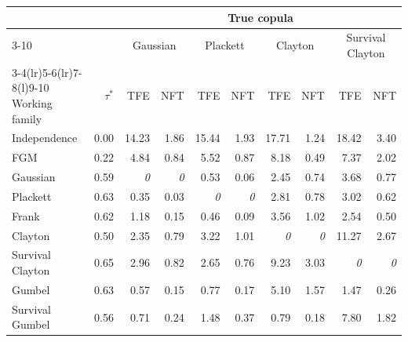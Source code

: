 \small
\begin{tabular}{@{}lrrrrrrrrr@{}}
\toprule
& & \multicolumn{8}{c}{True copula}\\
\cmidrule(l){3-10}
& & \multicolumn{2}{c}{Gaussian} & \multicolumn{2}{c}{Plackett} & \multicolumn{2}{c}{Clayton} & \multicolumn{2}{c}{Survival Clayton}\\
\cmidrule(lr){3-4}\cmidrule(lr){5-6}\cmidrule(lr){7-8}\cmidrule(l){9-10}
Working family & $\tau^*$ & TFE & NFT & TFE & NFT & TFE & NFT & TFE & NFT\\
\midrule
Independence & 0.00 & 14.23 & 1.86 & 15.44 & 1.93 & 17.71 & 1.24 & 18.42 & 3.40\\
FGM & 0.22 & 4.84 & 0.84 & 5.52 & 0.87 & 8.18 & 0.49 & 7.37 & 2.02\\
Gaussian & 0.59 & \textit{0} & \textit{0} & 0.53 & 0.06 & 2.45 & 0.74 & 3.68 & 0.77\\
Plackett & 0.63 & 0.35 & 0.03 & \textit{0} & \textit{0} & 2.81 & 0.78 & 3.02 & 0.62\\
Frank & 0.62 & 1.18 & 0.15 & 0.46 & 0.09 & 3.56 & 1.02 & 2.54 & 0.50\\
Clayton & 0.50 & 2.35 & 0.79 & 3.22 & 1.01 & \textit{0} & \textit{0} & 11.27 & 2.67\\
Survival Clayton & 0.65 & 2.96 & 0.82 & 2.65 & 0.76 & 9.23 & 3.03 & \textit{0} & \textit{0}\\
Gumbel & 0.63 & 0.57 & 0.15 & 0.77 & 0.17 & 5.10 & 1.57 & 1.47 & 0.26\\
Survival Gumbel & 0.56 & 0.71 & 0.24 & 1.48 & 0.37 & 0.79 & 0.18 & 7.80 & 1.82\\
\bottomrule
\end{tabular}
